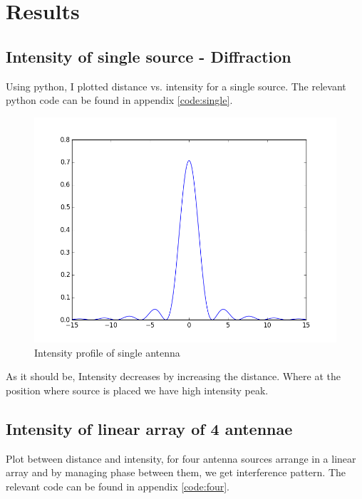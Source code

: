 \chapter{Results}

\section{Intensity of single source - Diffraction}

Using python, I plotted distance vs. intensity for a single source. The relevant python code can be found in appendix \ref{code:single}.

\begin{figure}[!h]
\centering	
\includegraphics[scale=0.45]{figure_1.png}
\caption{Intensity profile of single antenna}
\end{figure}

As it should be, Intensity decreases by increasing the distance. Where at the position where source is placed we have high intensity peak.

\section{Intensity of linear array of 4 antennae}

Plot between distance and intensity, for four antenna sources arrange in a linear array and by managing phase between them, we get interference pattern. The relevant code can be found in appendix \ref{code:four}.

